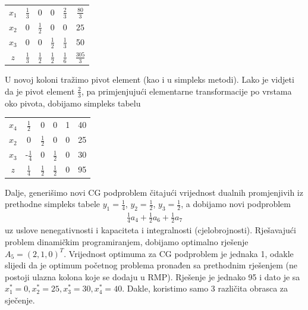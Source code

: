 \documentclass[a4paper, utf8, 11pt, colorlinks]{book}
\theoremstyle{definition}
\begin{document}
\begin{center}
	
	\begin{tabular}{ccccc|c}
		$x_1$ &     $\frac{1}{3}$  &   0 & 0  &      $ \frac{2}{3}$           & $\frac{80}{3}$ \\
		$x_2$ &     0              &  $\frac{1}{2}$  & 0     & 0                 &     $25$ \\
		$x_3$ &     0              &  0    &  $\frac{1}{2}$  & $ \frac{1}{3}$    & 50 \\ \hline
		$z$   &  $\frac{1}{3}$     &  $\frac{1}{2}$   &  $\frac{1}{2}$ &   $\frac{1}{6}$   & $\frac{305}{3}$ 
	\end{tabular}
\end{center}
U novoj koloni tražimo pivot element (kao i u simpleks metodi). Lako je vidjeti da je pivot element $\frac{2}{3}$, pa primjenjujući elementarne transformacije po vrstama oko pivota, dobijamo simpleks tabelu
\begin{center}
	\begin{tabular}{ccccc| c}
		  $x_4$ & $\frac{1}{2}$ & 0 & 0 & 1 & 40 \\
		  $x_2$ & 0 & $\frac{1}{2}$ & 0 & 0 & 25 \\
		  $x_3$ & -$\frac{1}{4}$ & 0 & $\frac{1}{2}$ & 0 & 30 \\ \hline
		  $z$ & $\frac{1}{4}$ & $\frac{1}{2}$ & $\frac{1}{2}$ & 0 & 95 
	\end{tabular}
\end{center}

Dalje, generišimo novi CG podproblem čitajući vrijednost dualnih promjenjivih iz prethodne simpleks tabele $y_1 = \frac{1}{4}$, $y_2 = \frac{1}{2}$, $y_3= \frac{1}{2}$, a dobijamo novi podproblem
\begin{align*}
	 \frac{1}{4} a_4 + \frac{1}{2} a_6 + \frac{1}{2} a_7
\end{align*}
uz uslove nenegativnosti i kapaciteta i integralnosti (cjelobrojnosti). Rješavajući problem dinamičkim programiranjem, dobijamo optimalno rješenje $A_5 = (2,1,0)^T$. Vrijednost optimuma za CG podproblem je jednaka 1, odakle slijedi da je optimum početnog problema pronađen sa prethodnim rješenjem (ne postoji ulazna kolona koje se dodaju u RMP). Rješenje je jednako 95 i dato je sa $x_1^* = 0, x_2^* = 25, x_3^*=30, x_4^*= 40$. Dakle, koristimo samo 3 različita obrasca za sječenje. 
\\ \vspace{1cm}
\end{document}
